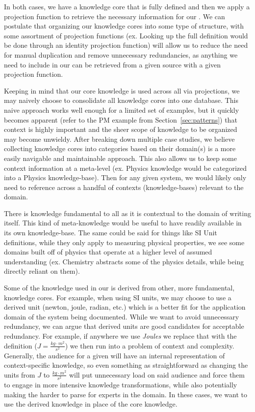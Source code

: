 In both cases, we have a knowledge core that is fully defined and then we apply 
a projection function to retrieve the necessary information for our \sf{}. We 
can postulate that organizing our knowledge cores into some type of structure, 
with some assortment of projection functions (ex. Looking up the full 
definition would be done through an identity projection function) will allow 
us to reduce the need for manual duplication and remove unnecessary 
redundancies, as anything we need to include in our \sfs{} can be retrieved 
from a given source with a given projection function.

Keeping in mind that our core knowledge is used across all \sfs{} via 
projections, we may naively choose to consolidate all knowledge cores into one 
database. This naive approach works well enough for a limited set of examples, 
but it quickly becomes apparent (refer to the PM example from 
Section~\ref{sec:patterns}) that context is highly important and the sheer 
scope of knowledge to be organized may become unwieldy. After breaking down 
multiple case studies, we believe collecting knowledge cores into categories 
based on their domain(s) is a more easily navigable and maintainable approach. 
This also allows us to keep some context information at a meta-level (ex. 
Physics knowledge would be categorized into a Physics knowledge-base). Then for 
any given system, we would likely only need to reference across a handful of 
contexts (knowledge-bases) relevant to the domain.

There is knowledge fundamental to all \sfs{} as it is contextual to the domain 
of \sf{} writing itself. This kind of meta-knowledge would be useful to have 
readily available in its own knowledge-base. The same could be said for things 
like SI Unit definitions, while they only apply to measuring physical 
properties, we see some domains built off of physics that operate at a higher 
level of assumed understanding (ex. Chemistry abstracts some of the physics 
details, while being directly reliant on them).

Some of the knowledge used in our \sfs{} is derived from other, more 
fundamental, knowledge cores. For example, when using SI units, we may choose 
to use a derived unit (newton, joule, radian, etc.) which 
is a better fit for the application domain of the system being documented. 
While we want to avoid unnecessary redundancy, we can argue that derived units 
are good candidates for acceptable redundancy. For example, if anywhere we use 
\emph{Joules} we replace that with the definition ($J = 
\frac{kg\cdot{}m^2}{s^2}$) we then run into a problem of context and 
complexity. Generally, the audience for a given \sf{} will have an internal 
representation of context-specific knowledge, so even something as 
straightforward as changing the units from $J$ to $\frac{kg\cdot{}m^2}{s^2}$ 
will put unnecessary load on said audience and force them to engage in more 
intensive knowledge transformations, while also potentially making the \sfs{} 
harder to parse for experts in the domain. In these cases, we want to use the 
derived knowledge in place of the core knowledge.


